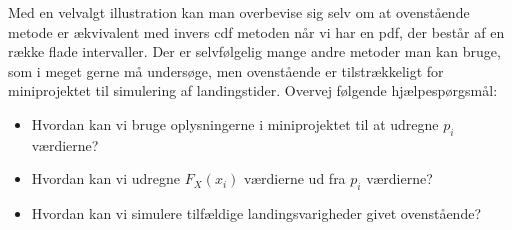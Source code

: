 \documentclass{article}
\begin{document}
Med en velvalgt illustration kan man overbevise sig selv om at ovenstående metode er ækvivalent med invers cdf metoden når vi har en pdf, der består af en række flade intervaller. Der er selvfølgelig mange andre metoder man kan bruge, som i meget gerne må undersøge, men ovenstående er tilstrækkeligt for miniprojektet til simulering af  landingstider. Overvej følgende hjælpespørgsmål:
\begin{itemize}
\item Hvordan kan vi bruge oplysningerne i miniprojektet til at udregne $p_i$ værdierne? 
\item Hvordan kan vi udregne $F_X(x_i)$ værdierne ud fra $p_i$ værdierne? 
\item Hvordan kan vi simulere tilfældige landingsvarigheder givet ovenstående? 
\end{itemize} 

\printbibliography[heading=bibintoc]
\label{bib:mybiblio}
\end{document}
